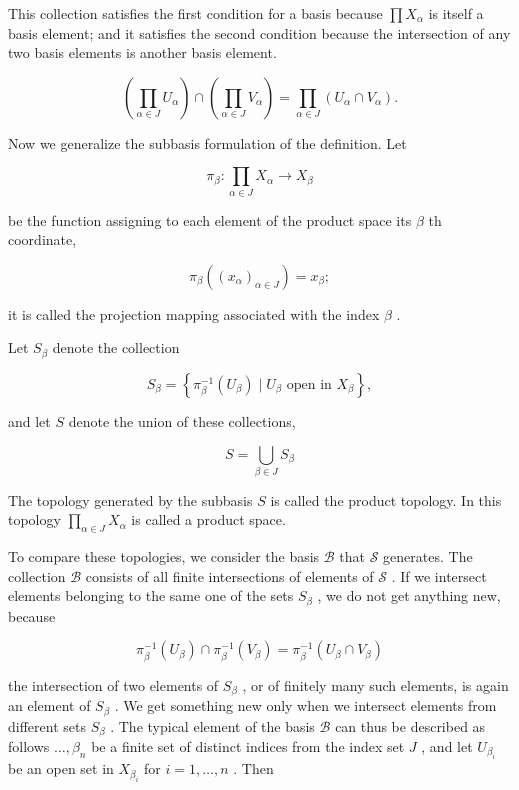 This collection satisfies the first condition for a basis because \(\prod {X}_{\alpha }\) is itself a basis element; and it satisfies the second condition because the intersection of any two basis elements is another basis element.

\[
\left( {\mathop{\prod }\limits_{{\alpha  \in  J}}{U}_{\alpha }}\right)  \cap  \left( {\mathop{\prod }\limits_{{\alpha  \in  J}}{V}_{\alpha }}\right)  = \mathop{\prod }\limits_{{\alpha  \in  J}}\left( {{U}_{\alpha } \cap  {V}_{\alpha }}\right) .
\]

Now we generalize the subbasis formulation of the definition. Let

\[
{\pi }_{\beta } : \mathop{\prod }\limits_{{\alpha  \in  J}}{X}_{\alpha } \rightarrow  {X}_{\beta }
\]

be the function assigning to each element of the product space its \(\beta\) th coordinate,

\[
{\pi }_{\beta }\left( {\left( {x}_{\alpha }\right) }_{\alpha  \in  J}\right)  = {x}_{\beta };
\]

it is called the projection mapping associated with the index \(\beta\) .

\begin{definition} Let \({S}_{\beta }\) denote the collection

\[
{S}_{\beta } = \left\{  {{\pi }_{\beta }^{-1}\left( {U}_{\beta }\right)  \mid  {U}_{\beta }\text{ open in }{X}_{\beta }}\right\}  ,
\]

and let \(S\) denote the union of these collections,

\[
S = \mathop{\bigcup }\limits_{{\beta  \in  J}}{S}_{\beta }
\]

The topology generated by the subbasis \(S\) is called the product topology. In this topology \(\mathop{\prod }\limits_{{\alpha  \in  J}}{X}_{\alpha }\) is called a product space.
\end{definition}

To compare these topologies, we consider the basis \(\mathcal{B}\) that \(\mathcal{S}\) generates. The collection \(\mathcal{B}\) consists of all finite intersections of elements of \(\mathcal{S}\) . If we intersect elements belonging to the same one of the sets \({S}_{\beta }\) , we do not get anything new, because

\[
{\pi }_{\beta }^{-1}\left( {U}_{\beta }\right)  \cap  {\pi }_{\beta }^{-1}\left( {V}_{\beta }\right)  = {\pi }_{\beta }^{-1}\left( {{U}_{\beta } \cap  {V}_{\beta }}\right)
\]

the intersection of two elements of \({S}_{\beta }\) , or of finitely many such elements, is again an element of \({S}_{\beta }\) . We get something new only when we intersect elements from different sets \({S}_{\beta }\) . The typical element of the basis \(\mathcal{B}\) can thus be described as follows \(\ldots ,{\beta }_{n}\) be a finite set of distinct indices from the index set \(J\) , and let \({U}_{{\beta }_{i}}\) be an open set in \({X}_{{\beta }_{i}}\) for \(i = 1,\ldots ,n\) . Then

